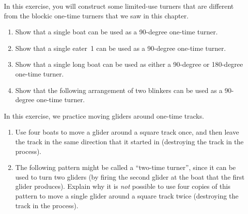 \begin{multicols}{2}
\mfilbreak


\begin{problemstar}\label{exer:boat_one_time_turner}
	In this exercise, you will construct some limited-use turners that are different from the blockic one-time turners that we saw in this chapter.
	\begin{enumerate}[label=\bf\color{ocre}(\alph*)]
		\item Show that a single boat can be used as a 90-degree one-time turner.
		
		\item Show that a single eater~1 can be used as a 90-degree one-time turner.
		
		\item Show that a single long boat can be used as either a 90-degree or 180-degree one-time turner.
		
		\item Show that the following arrangement of two blinkers can be used as a 90-degree one-time turner.
		\begin{center}
		\end{center}
	\end{enumerate}
\end{problemstar}


\mfilbreak


\begin{problemstar}\label{exer:turner_tracks}
	In this exercise, we practice moving gliders around one-time tracks.
	\begin{enumerate}[label=\bf\color{ocre}(\alph*)]
		\item Use four boats to move a glider around a square track once, and then leave the track in the same direction that it started in (destroying the track in the process).
		
		\item The following pattern might be called a ``two-time turner'', since it can be used to turn two gliders (by firing the second glider at the boat that the first glider produces). Explain why it is \emph{not} possible to use four copies of this pattern to move a single glider around a square track twice (destroying the track in the process).
		\begin{center}
		\end{center}
		

\end{enumerate}
\end{problemstar}
\end{multicols}

